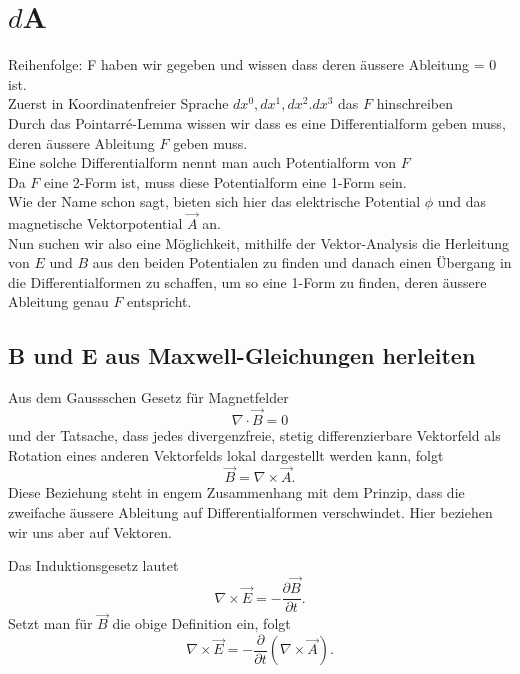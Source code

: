 \section{$d$A
	\label{maxwell:section:dA}}
Reihenfolge:
F haben wir gegeben und wissen dass deren äussere Ableitung = 0 ist.\\
Zuerst in Koordinatenfreier Sprache $dx^0,dx^1,dx^2.dx^3$ das $F$ hinschreiben\\
Durch das Pointarré-Lemma wissen wir dass es eine Differentialform geben muss, deren äussere Ableitung $F$ geben muss.\\
Eine solche Differentialform nennt man auch Potentialform von $F$\\
Da $F$ eine 2-Form ist, muss diese Potentialform eine 1-Form sein.\\
Wie der Name schon sagt, bieten sich hier das elektrische Potential $\phi$ und das magnetische Vektorpotential $\vec{A}$ an.\\
Nun suchen wir also eine Möglichkeit, mithilfe der Vektor-Analysis die Herleitung von $E$ und $B$ aus den beiden Potentialen zu finden und danach einen Übergang in die Differentialformen zu schaffen, um so eine 1-Form zu finden, deren äussere Ableitung genau $F$ entspricht.
\subsection{B und E aus Maxwell-Gleichungen herleiten}
Aus dem Gaussschen Gesetz für Magnetfelder
\begin{equation}
	\nabla \cdot \vec{B} = 0
\end{equation}
und der Tatsache, dass jedes divergenzfreie, stetig differenzierbare Vektorfeld als Rotation eines anderen Vektorfelds lokal dargestellt werden kann,
folgt
\begin{equation}
	\vec{B} = \nabla \times \vec{A}.
\end{equation}
Diese Beziehung steht in engem Zusammenhang mit dem Prinzip, dass die zweifache äussere Ableitung auf Differentialformen verschwindet. Hier beziehen wir uns aber auf Vektoren.

Das Induktionsgesetz lautet
\begin{equation}
	\nabla \times \vec{E} = - \frac{\partial \vec{B}}{\partial t}.
\end{equation}
Setzt man für $\vec{B}$ die obige Definition ein, folgt
\begin{equation}
	\nabla \times \vec{E} = - \frac{\partial}{\partial t}(\nabla \times \vec{A}).
\end{equation}

